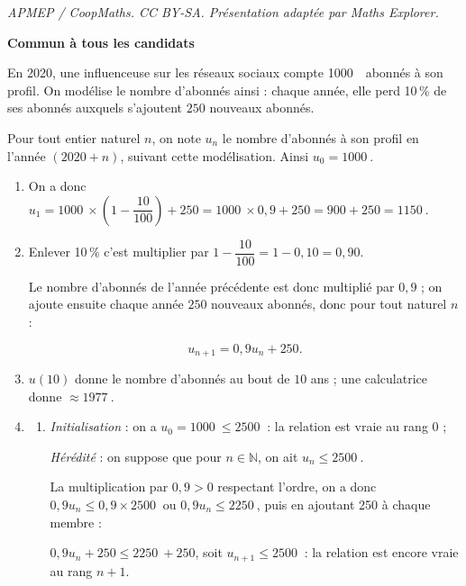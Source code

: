 \documentclass[10pt]{article}
\providecommand{\N}{\mathbb{N}}
\providecommand{\np}[2][]{{#2~#1}}
\begin{document}
\noindent\textit{APMEP / CoopMaths. CC BY-SA. Présentation adaptée par Maths Explorer.}\par\medskip
\textbf{Commun à tous les candidats}

\medskip

En 2020, une influenceuse sur les réseaux sociaux compte \np{1000}~abonnés à son profil. On modélise le nombre d'abonnés ainsi : chaque année, elle perd 10\,\% de ses abonnés auxquels s'ajoutent $250$ nouveaux abonnés.

Pour tout entier naturel $n$, on note $u_n$ le nombre d'abonnés à son profil en l'année $(2020 + n)$, suivant cette modélisation. Ainsi $u_0 = \np{1000}$.

\medskip

\begin{enumerate}
\item 
On a donc $u_1 = \np{1000} \times \left(1 - \dfrac{10}{100}\right) + 250 = \np{1000} \times 0,9 + 250 = 900 + 250 = \np{1150}$.
\item 

Enlever 10\,\% c'est multiplier par $1 - \dfrac{10}{100} = 1 - 0,10 = 0,90$.

Le nombre d'abonnés de l'année précédente est donc multiplié par $0,9$ ; on ajoute ensuite chaque année $250$ nouveaux abonnés, donc pour tout naturel $n$ :

\[u_{n+1} = 0,9u_n + 250.\]

\item 










$u(10)$ donne le nombre d'abonnés au bout de $10$ ans ; une calculatrice donne $\approx \np{1977}$.
\item 
	\begin{enumerate}
		\item 

\emph{Initialisation } : on a $u_0 = \np{1000} \leqslant  \np{2500}$ : la relation est vraie au rang $0$ ;

\emph{Hérédité} : on suppose que pour $n \in \N$, on ait $u_n \leqslant \np{2500}$.

La multiplication par $0,9  > 0$ respectant l'ordre, on a donc $0,9u_n \leqslant 0,9 \times \np{2500}$ ou $0,9u_n \leqslant \np{2250}$, puis en ajoutant 250 à chaque membre :

$0,9u_n + 250 \leqslant \np{2250} + 250$, soit $u_{n+1} \leqslant \np{2500}$ : la relation est encore vraie au rang $n+1$.


\end{enumerate}
\end{enumerate}
\end{document}
